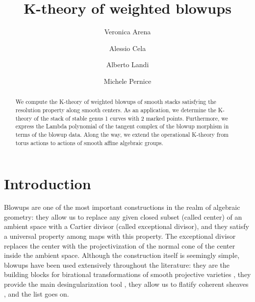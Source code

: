 \documentclass[12pt]{amsart}
\title{K-theory of weighted blowups}
\author{Veronica Arena}
\author{Alessio Cela}
\author{Alberto Landi}
\author{Michele Pernice}
\theoremstyle{definition}
\begin{document}
\begin{abstract}
    We compute the K-theory of weighted blowups of smooth stacks satisfying the resolution property along smooth centers. As an application, we determine the K-theory of the stack of stable genus 1 curves with 2 marked points. Furthermore, we express the Lambda polynomial of the tangent complex of the blowup morphism in terms of the blowup data.
    Along the way, we extend the operational K-theory from torus actions to actions of smooth affine algebraic groups.
\end{abstract}

\maketitle


\section{Introduction}

Blowups are one of the most important constructions in the realm of algebraic geometry: they allow us to replace any given closed subset (called center) of an ambient space with a Cartier divisor (called exceptional divisor), and they satisfy a universal property among maps with this property. The exceptional divisor replaces the center with the projectivization of the normal cone of the center inside the ambient space. Although the construction itself is seemingly simple, blowups have been used extensively throughout the literature: they are the building blocks for birational transformations of smooth projective varieties \cite{AKMW_weakfactorization}, they provide the main desingularization tool \cite{hironaka-resolution}, they allow us to flatify coherent sheaves \cite{GruRay}, and the list goes on.
\end{document}
